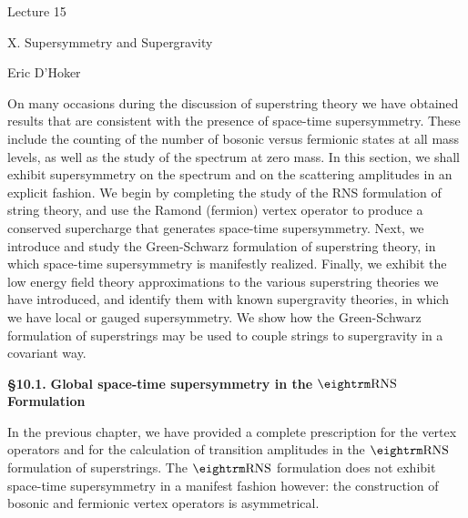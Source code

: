 \def\epsbar{\bar{\epsilon}}
\def\thetadot{{\dot{\theta}}}
\def\Pidot{{\dot{\Pi}}}
\def\GS{\hbox{\rm GS}}
\def\Ebar{\bar{E}}
\def\twosquares{\hbox{$\square\kern-2.255pt\square$}}
\def\splitsquare{\hbox{$\square$}\kern-7.79pt%
  \raise6pt\hbox{$\square$}}
\def\threesquares{\hbox{$\square$}\kern-7.79pt%
  \raise6pt\hbox{$\square$}\kern-7.79pt%
  \raise12pt\hbox{$\square$}}
\def\rhobar{{\bar{\rho}}} 
\def\abar{\bar{a}}
\def\chibar{\bar{\chi}}
\def\sigmabar{\bar{\sigma}}
\def\omebar{\bar{\omega}} 
\def\Fhat{\widehat{F}}
\def\omehat{\widehat{\omega}}
\def\etabar{\bar{\eta}}
\def\SU{\hbox{\rm SU}}
\def\Htil{\widetilde{H}}


\parindent=25pt

\bigskip\bigskip
\centerline{\boldtitlefont Lecture 15}
\bigskip
\centerline{\smallboldtitle X. Supersymmetry and Supergravity}

\medskip
\centerline{Eric D'Hoker}

\frenchspacing

\dspace
\bigskip
On many occasions during the discussion of superstring
theory we have obtained results that are consistent
with the presence of space-time supersymmetry.
These include the counting of the number of bosonic
versus fermionic states at all mass levels, as well as
the study of the spectrum at zero mass.
In this section, we shall exhibit supersymmetry on the
spectrum and on the scattering amplitudes in an
explicit fashion.
We begin by completing the study of the RNS formulation of
 string theory, and
use the Ramond (fermion) vertex operator to produce a
conserved supercharge that generates space-time
supersymmetry.
Next, we introduce and study the Green-Schwarz
formulation of superstring theory, in which space-time
supersymmetry is manifestly realized.
Finally, we exhibit the low energy field theory
approximations to the various superstring theories we have
introduced, and
identify them with known supergravity theories, in
which we have local or gauged supersymmetry.
We show how the Green-Schwarz formulation of
superstrings may be used to couple strings to
supergravity in a  covariant way.

\bigskip\noindent
{\bf \S 10.1.} {\bf Global space-time supersymmetry in 
the $\RNS$ Formulation}

In the previous chapter, we have provided a complete
prescription for the vertex operators and for the calculation
of transition amplitudes in the $\RNS$ formulation of
superstrings.
The $\RNS$ formulation does not exhibit space-time
supersymmetry in a manifest fashion however:
the construction of bosonic and fermionic vertex
operators is asymmetrical.

